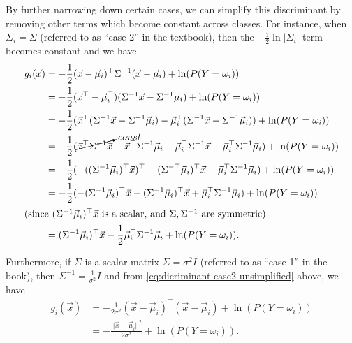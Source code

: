 \documentclass[headings=optiontoheadandtoc,listof=totoc,parskip=full]{scrartcl}
\begin{document}
By further narrowing down certain cases, we can simplify this discriminant by removing other terms which become constant across classes. For instance, when $\Sigma_i = \Sigma$ (referred to as ``case 2'' in the textbook), then the $-\frac{1}{2}\ln|\Sigma_i|$ term becomes constant and we have
\begin{align}
	g_i(\vec x) &= -\frac{1}{2}(\vec x - \vec\mu_i)^\top \Sigma^{-1} (\vec x - \vec\mu_i) + \ln(P(Y = \omega_i)) \label{eq:dicriminant-case2-unsimplified}\\
		&= -\frac{1}{2}(\vec x^\top - \vec\mu_i^\top)  (\Sigma^{-1}\vec x - \Sigma^{-1}\vec\mu_i) + \ln(P(Y = \omega_i)) \nonumber\\
		&= -\frac{1}{2}(\vec x^\top(\Sigma^{-1}\vec x - \Sigma^{-1}\vec\mu_i) - \vec\mu_i^\top(\Sigma^{-1}\vec x - \Sigma^{-1}\vec\mu_i)) + \ln(P(Y = \omega_i)) \nonumber\\
		&= -\frac{1}{2}( \cancelto{const}{\vec x^\top\Sigma^{-1}\vec x} - \vec x^\top\Sigma^{-1}\vec\mu_i - \vec\mu_i^\top\Sigma^{-1}\vec x + \vec\mu_i^\top\Sigma^{-1}\vec\mu_i) + \ln(P(Y = \omega_i)) \nonumber\\
		&= -\frac{1}{2}(-((\Sigma^{-1}\vec\mu_i)^\top\vec x)^\top - (\Sigma^{-\top}\vec\mu_i)^\top\vec x + \vec\mu_i^\top\Sigma^{-1}\vec\mu_i) + \ln(P(Y = \omega_i)) \nonumber\\
		&= -\frac{1}{2}(-(\Sigma^{-1}\vec\mu_i)^\top\vec x - (\Sigma^{-1}\vec\mu_i)^\top\vec x + \vec\mu_i^\top\Sigma^{-1}\vec\mu_i) + \ln(P(Y = \omega_i)) \nonumber\\
	\shortintertext{(since $(\Sigma^{-1}\vec\mu_i)^\top\vec x$ is a scalar, and $\Sigma, \Sigma^{-1}$ are symmetric)}
		&= (\Sigma^{-1}\vec\mu_i)^\top\vec x -\frac{1}{2}\vec\mu_i^\top\Sigma^{-1}\vec\mu_i + \ln(P(Y = \omega_i)). \label{eq:dicriminant-case2}
\end{align}

Furthermore, if $\Sigma$ is a scalar matrix $\Sigma = \sigma^2 I$ (referred to as ``case 1'' in the book), then $\Sigma^{-1} = \frac{1}{\sigma^2} I$ and from \cref{eq:dicriminant-case2-unsimplified} above, we have
\begin{equation}
	\begin{split}
		g_i(\vec x) &= -\frac{1}{2\sigma^2}(\vec x - \vec\mu_i)^\top(\vec x - \vec\mu_i) + \ln(P(Y = \omega_i))\\
			&= -\frac{||\vec x - \vec\mu_i||^2}{2\sigma^2} + \ln(P(Y = \omega_i)). \label{eq:dicriminant-case1}
	\end{split}
\end{equation}
\end{document}
